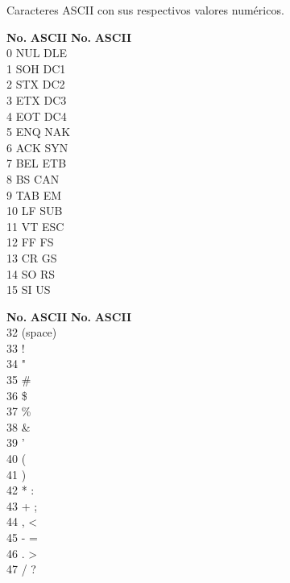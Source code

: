 Caracteres ASCII con sus respectivos valores numéricos.

\begin{tabbing}
\textbf{No.}\hspace{1cm} \=  \textbf{ASCII}\hspace{2cm} \= \textbf{No.}\hspace{1cm} \= \textbf{ASCII}\hspace{2cm}  \\ 
0 \> NUL  \> DLE \\
1 \> SOH  \> DC1 \\
2 \> STX  \> DC2 \\
3 \> ETX  \> DC3 \\
4 \> EOT  \> DC4 \\
5 \> ENQ  \> NAK \\
6 \> ACK  \> SYN \\
7 \> BEL  \> ETB \\
8 \> BS  \> CAN \\
9 \> TAB  \> EM \\
10 \> LF  \> SUB \\
11 \> VT  \> ESC \\
12 \> FF  \> FS \\
13 \> CR  \> GS \\
14 \> SO  \> RS \\
15 \> SI  \> US \\ 
\end{tabbing}


\begin{tabbing}
\textbf{No.}\hspace{1cm} \=  \textbf{ASCII}\hspace{2cm} \= \textbf{No.}\hspace{1cm} \= \textbf{ASCII}\hspace{2cm}  \\ 
32 \> (space)   \\
33 \> !   \\
34 \> "   \\
35 \> \#   \\
36 \> \$   \\
37 \> \%   \\
38 \> \&   \\
39 \> '   \\
40 \> (   \\
41 \> )   \\
42 \> *  \> : \\
43 \> +  \> ; \\
44 \> ,  \> < \\
45 \> -  \> = \\
46 \> .  \> > \\
47 \> /  \> ? \\ 
\end{tabbing}

